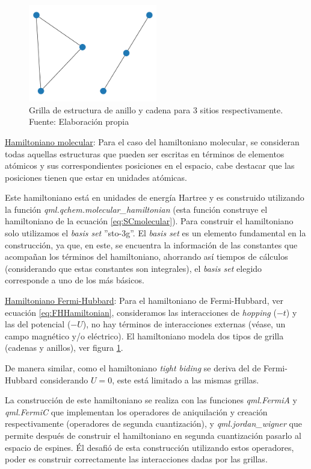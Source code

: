 \begin{figure}[H]
\centering
\includegraphics[width=0.5\textwidth]{figures/S3/condiciones.png}
\caption{\label{fig:CBorde} Grilla de estructura de anillo y cadena para 3 sitios respectivamente. Fuente: Elaboración propia}
\end{figure}

\underline{Hamiltoniano molecular}: 
Para el caso del hamiltoniano molecular, se consideran todas aquellas estructuras que pueden ser escritas en términos de elementos atómicos y sus correspondientes posiciones en el espacio, cabe destacar que las posiciones tienen que estar en unidades atómicas. 

Este hamiltoniano está en unidades de energía Hartree y es construido utilizando la función \textit{qml.qchem.molecular\_hamiltonian} (esta función construye el hamiltoniano de la ecuación \ref{eq:SCmolecular}). Para construir el hamiltoniano solo utilizamos el \textit{basis set} ''sto-3g''. El \textit{basis set} es un elemento fundamental en la construcción, ya que, en este, se encuentra la información de las constantes que acompañan los términos del hamiltoniano, ahorrando así tiempos de cálculos (considerando que estas constantes son integrales), el \textit{basis set} elegido corresponde a uno de los más básicos.

\underline{Hamiltoniano Fermi-Hubbard}: 
Para el hamiltoniano de Fermi-Hubbard, ver ecuación \ref{eq:FHHamiltonian}, consideramos las interacciones de \textit{hopping} ($-t$) y las del potencial ($-U$), no hay términos de interacciones externas (véase, un campo magnético y/o eléctrico). El hamiltoniano modela dos tipos de grilla (cadenas y anillos), ver figura \ref{fig:CBorde}.

De manera similar, como el hamiltoniano \textit{tight biding} se deriva del de Fermi-Hubbard considerando $U=0$, este está limitado a las mismas grillas.

La construcción de este hamiltoniano se realiza con las funciones \textit{qml.FermiA} y \textit{qml.FermiC} que implementan los operadores de aniquilación y creación respectivamente (operadores de segunda cuantización), y \textit{qml.jordan\_wigner} que permite después de construir el hamiltoniano en segunda cuantización pasarlo al espacio de espines. Él desafió de esta construcción utilizando estos operadores, poder es construir correctamente las interacciones dadas por las grillas.


